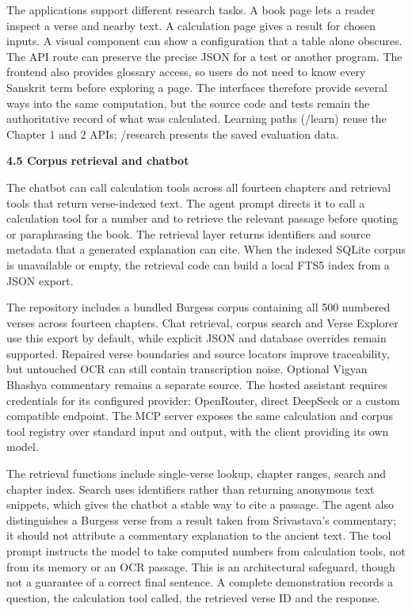 \documentclass[
]{article}
\begin{document}
The applications support different research tasks. A book page lets a
reader inspect a verse and nearby text. A calculation page gives a
result for chosen inputs. A visual component can show a configuration
that a table alone obscures. The API route can preserve the precise JSON
for a test or another program. The frontend also provides glossary
access, so users do not need to know every Sanskrit term before
exploring a page. The interfaces therefore provide several ways into the
same computation, but the source code and tests remain the authoritative
record of what was calculated. Learning paths (/learn) reuse the Chapter
1 and 2 APIs; /research presents the saved evaluation data.

\textbf{4.5 Corpus retrieval and chatbot}

The chatbot can call calculation tools across all fourteen chapters and
retrieval tools that return verse-indexed text. The agent prompt directs
it to call a calculation tool for a number and to retrieve the relevant
passage before quoting or paraphrasing the book. The retrieval layer
returns identifiers and source metadata that a generated explanation can
cite. When the indexed SQLite corpus is unavailable or empty, the
retrieval code can build a local FTS5 index from a JSON export.

The repository includes a bundled Burgess corpus containing all 500
numbered verses across fourteen chapters. Chat retrieval, corpus search
and Verse Explorer use this export by default, while explicit JSON and
database overrides remain supported. Repaired verse boundaries and
source locators improve traceability, but untouched OCR can still
contain transcription noise. Optional Vigyan Bhashya commentary remains
a separate source. The hosted assistant requires credentials for its
configured provider: OpenRouter, direct DeepSeek or a custom compatible
endpoint. The MCP server exposes the same calculation and corpus tool
registry over standard input and output, with the client providing its
own model.

The retrieval functions include single-verse lookup, chapter ranges,
search and chapter index. Search uses identifiers rather than returning
anonymous text snippets, which gives the chatbot a stable way to cite a
passage. The agent also distinguishes a Burgess verse from a result
taken from Srivastava's commentary; it should not attribute a commentary
explanation to the ancient text. The tool prompt instructs the model to
take computed numbers from calculation tools, not from its memory or an
OCR passage. This is an architectural safeguard, though not a guarantee
of a correct final sentence. A complete demonstration records a
question, the calculation tool called, the retrieved verse ID and the
response.
\end{document}
